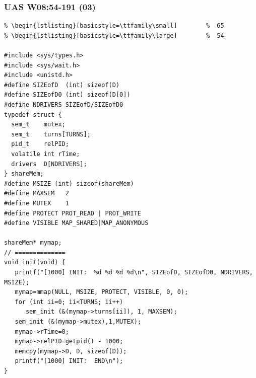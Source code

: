 \documentclass[aspectratio=169, xcolor=table, notheorems, hyperref={pdfpagelabels=false}]{beamer}
\begin{document}
\begin{frame}[fragile]
\frametitle{UAS W08:54-191 (03)}
\begin{lstlisting}[basicstyle=\ttfamily\tiny]         % 108
% \begin{lstlisting}[basicstyle=\ttfamily\footnotesize] %  72
% \begin{lstlisting}[basicstyle=\ttfamily\small]        %  65
% \begin{lstlisting}[basicstyle=\ttfamily\large]        %  54

#include <sys/types.h>
#include <sys/wait.h>
#include <unistd.h>
#define SIZEofD  (int) sizeof(D)
#define SIZEofD0 (int) sizeof(D[0])
#define NDRIVERS SIZEofD/SIZEofD0
typedef struct {
  sem_t    mutex;
  sem_t    turns[TURNS];
  pid_t    relPID;
  volatile int rTime;
  drivers  D[NDRIVERS];
} shareMem;
#define MSIZE (int) sizeof(shareMem)
#define MAXSEM   2
#define MUTEX    1
#define PROTECT PROT_READ | PROT_WRITE
#define VISIBLE MAP_SHARED|MAP_ANONYMOUS

shareMem* mymap;
// ==============
void init(void) {
   printf("[1000] INIT:  %d %d %d %d\n", SIZEofD, SIZEofD0, NDRIVERS, MSIZE);
   mymap=mmap(NULL, MSIZE, PROTECT, VISIBLE, 0, 0);
   for (int ii=0; ii<TURNS; ii++)
      sem_init (&(mymap->turns[ii]), 1, MAXSEM);
   sem_init (&(mymap->mutex),1,MUTEX);
   mymap->rTime=0;
   mymap->relPID=getpid() - 1000;
   memcpy(mymap->D, D, sizeof(D));
   printf("[1000] INIT:  END\n");
}   

\end{lstlisting}
\end{frame}
\end{document}
